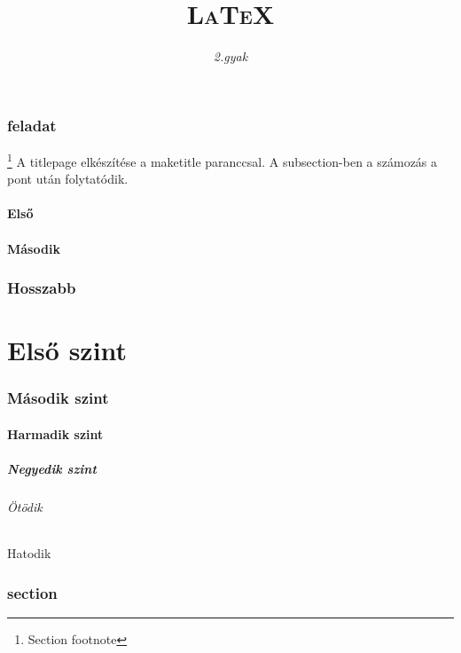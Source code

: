 \documentclass[twocolumn]{book}
\begin{document}
	\pagestyle{headings}
	\begin{titlepage}
		\title{\textsc{\huge{LaTeX}}}
		\author{\textit{\Large{2.gyak}}}
		\maketitle
	\end{titlepage}

\renewcommand{\thefootnote}{\fnsymbol{footnote}}

\setcounter{tocdepth}{5}
\tableofcontents
\clearpage
{}
\pagestyle{myheadings}
\section{feladat}\footnote{Section footnote}
A titlepage elkészítése a maketitle paranccsal. A subsection-ben a számozás a pont után folytatódik.
\subsection{Első}
\hulipsum[2]
\clearpage
\subsection{Második}
\hulipsum[3]
\section{Hosszabb}
\part{Első szint}
\section{Második szint}
\subsection{Harmadik szint}
\subsubsection{Negyedik szint}
\paragraph{Ötödik}
\subparagraph{Hatodik}

\appendix

\pagestyle{fancy}
\section{section}
\begin{quote}
	\hulipsum[1-2]
\end{quote}
\end{document}
